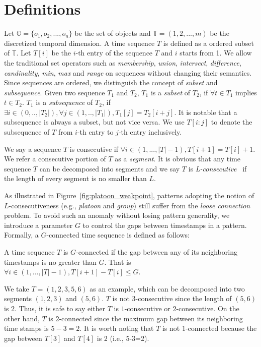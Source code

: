 \section{Definitions}
\label{sec:definition}
Let $\mathbb{O} = \{o_1 ,o_2,...,o_n\}$ be the set of objects and $\mathbb{T} =(1,2,...,m)$ be the discretized temporal dimension. 
A time sequence $T$ is defined as a ordered subset of $\mathbb{T}$. 
Let $T[i]$ be the $i$-th entry of the sequence $T$ and $i$ starts from 1.
We allow the traditional set operators 
such as \emph{membership}, \emph{union}, \emph{intersect},
\emph{difference}, \emph{candinality}, \emph{min},  \emph{max} and  \emph{range} on 
sequences without changing their semantics. 
Since sequences are ordered, we distinguish the concept of \emph{subset}
and \emph{subsequence}. Given two sequence $T_1$ and $T_2$, 
$T_1$ is a \emph{subset} of $T_2$, if $\forall t \in T_1$ implies $t \in T_2$.
$T_1$ is a \emph{subsequence} of $T_2$, if $\exists i \in (0,..,|T_2|), \forall j \in (1,..,|T_1|),  T_1[j]=T_2[i+j]$.
It is notable that a subsequence is always a subset, but not vice versa. We use $T[i:j]$ to denote
the subsequence of $T$ from $i$-th entry to $j$-th entry inclusively.

We say a sequence $T$ is consecutive 
if $\forall i \in (1,...,|T|-1), T[i+1] = T[i] + 1$.  We refer a consecutive
portion of $T$ as a \emph{segment}.
It is obvious that any time sequence $T$ can be decomposed into
segments and we say $T$ is \textit{L-consecutive}~\cite{li2015platoon} 
if the length of every segment is no smaller than $L$. 

As illustrated in Figure~\ref{fig:platoon_weakpoint}, patterns adopting the notion of $L$-consecutiveness (e.g., \emph{platoon} and \emph{group}) still suffer from the \emph{loose connection} problem. 
To avoid such an anomaly without losing pattern generality, we introduce a parameter $G$ to control the gaps between
timestamps in a pattern. Formally, a $G$-connected time sequence is defined as follows:

\begin{definition}[$G$-connected]
A time sequence $T$ is $G$-connected if the gap between any of its neighboring timestamps is no greater than $G$. That is
 $\forall i \in (1,...,|T|-1), T[i+1]-T[i] \leq G$.
\end{definition}

We take $T=(1,2,3,5,6)$ as an example, which can be decomposed into two segments $(1,2,3)$ and $(5,6)$. $T$ is not $3$-consecutive since the length of $(5,6)$ is $2$. Thus, it is safe to say either $T$ is $1$-consecutive or $2$-consecutive. On the other hand, $T$ is $2$-connected since the maximum gap between its neighboring time stamps is $5-3=2$. It is worth noting that $T$ is not $1$-connected because the gap between $T[3]$ and $T[4]$ is 2 (i.e., 5-3=2).

